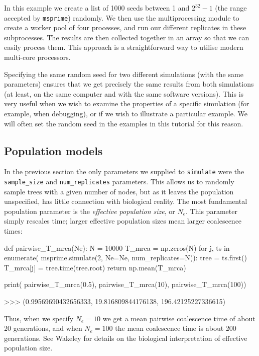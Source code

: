 \documentclass[graybox]{svmult}
\newcommand{\msprime}[0]{\texttt{msprime}}
\begin{document}
    In this example we create a list of 1000 seeds between 1 and $2^{32} -
1$ (the range accepted by \msprime) randomly. We then use the
multiprocessing module to create a worker pool of four processes, and
run our different replicates in these subprocesses. The results are then
collected together in an array so that we can easily process them.
This approach is a straightforward way to utilise modern
multi-core processors.

Specifying the same random seed for two different simulations (with the
same parameters) ensures that we get precisely the same results from
both simulations (at least, on the same computer and with the same
software versions). This is very useful when we wish to examine the
properties of a specific simulation (for example, when debugging), or if
we wish to illustrate a particular example. We will often set the random
seed in the examples in this tutorial for this reason.

\subsection{Population models}\label{population-models}

In the previous section the only parameters we supplied to
\texttt{simulate} were the \texttt{sample\_size} and
\texttt{num\_replicates} parameters. This allows us to randomly sample
trees with a given number of nodes, but as it leaves the population unspecified, has little connection with
biological reality. The most fundamental population parameter is the \emph{effective population size}, or
\(N_e\). This parameter simply rescales time; larger effective
population sizes mean larger coalescence times:

\begin{pythoncode}
def pairwise_T_mrca(Ne):
    N = 10000
    T_mrca = np.zeros(N)
    for j, ts in enumerate(
            msprime.simulate(2, Ne=Ne, num_replicates=N)):
        tree = ts.first()
        T_mrca[j] = tree.time(tree.root)
    return np.mean(T_mrca)

print(
    pairwise_T_mrca(0.5), pairwise_T_mrca(10),
    pairwise_T_mrca(100))

>>> (0.99569690432656333, 19.816809844176138, 196.42125227336615)
\end{pythoncode}

    Thus, when we specify \(N_e=10\) we get a mean pairwise coalescence time of about
20 generations, and when \(N_e=100\) the mean coalescence time is about
200 generations. See Wakeley \citep{Wakeley2009} for details on the biological interpretation of effective population size.
\end{document}
